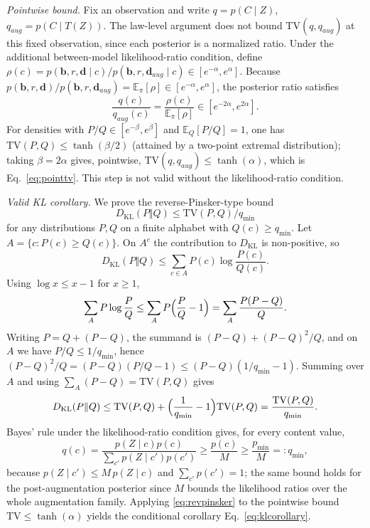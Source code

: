 \documentclass[electronics,article,submit,moreauthors]{Definitions/mdpi}
\begin{document}
\emph{Pointwise bound.} Fix an observation and write $q=p(C\mid Z)$, $q_{aug}=p(C\mid T(Z))$. The law-level argument does not bound $\mathrm{TV}(q,q_{aug})$ at this fixed observation, since each posterior is a normalized ratio. Under the additional between-model likelihood-ratio condition, define $\rho(c)=p(\mathbf b,r,\mathbf d\mid c)/p(\mathbf b,r,\mathbf d_{aug}\mid c)\in[e^{-\alpha},e^{\alpha}]$. Because $p(\mathbf b,r,\mathbf d)/p(\mathbf b,r,\mathbf d_{aug})=\mathbb E_\pi[\rho]\in[e^{-\alpha},e^{\alpha}]$, the posterior ratio satisfies
\begin{equation}
\frac{q(c)}{q_{aug}(c)}=\frac{\rho(c)}{\mathbb E_\pi[\rho]}\in[e^{-2\alpha},e^{2\alpha}].
\end{equation}
For densities with $P/Q\in[e^{-\beta},e^{\beta}]$ and $\mathbb E_Q[P/Q]=1$, one has $\mathrm{TV}(P,Q)\le\tanh(\beta/2)$ (attained by a two-point extremal distribution); taking $\beta=2\alpha$ gives, pointwise, $\mathrm{TV}(q,q_{aug})\le\tanh(\alpha)$, which is Eq.~\eqref{eq:pointtv}. This step is not valid without the likelihood-ratio condition.

\emph{Valid KL corollary.} We prove the reverse-Pinsker-type bound
\begin{equation*}
D_{\mathrm{KL}}(P\Vert Q)\le \mathrm{TV}(P,Q)/q_{\min}
\end{equation*}
for any distributions $P,Q$ on a finite alphabet with $Q(c)\ge q_{\min}$. Let $A=\{c:P(c)\ge Q(c)\}$. On $A^c$ the contribution to $D_{\mathrm{KL}}$ is non-positive, so
\begin{equation*}
D_{\mathrm{KL}}(P\Vert Q)\le\sum_{c\in A}P(c)\log\frac{P(c)}{Q(c)}.
\end{equation*}
Using $\log x\le x-1$ for $x\ge1$,
\begin{equation*}
\sum_{A}P\log\frac{P}{Q}\le\sum_{A}P\Bigl(\frac{P}{Q}-1\Bigr)=\sum_{A}\frac{P(P-Q)}{Q}.
\end{equation*}
Writing $P=Q+(P-Q)$, the summand is $(P-Q)+(P-Q)^2/Q$, and on $A$ we have $P/Q\le 1/q_{\min}$, hence $(P-Q)^2/Q=(P-Q)(P/Q-1)\le(P-Q)(1/q_{\min}-1)$. Summing over $A$ and using $\sum_A(P-Q)=\mathrm{TV}(P,Q)$ gives
\begin{equation}
D_{\mathrm{KL}}(P\Vert Q)\le\mathrm{TV}(P,Q)+\Bigl(\frac{1}{q_{\min}}-1\Bigr)\mathrm{TV}(P,Q)=\frac{\mathrm{TV}(P,Q)}{q_{\min}}.
\label{eq:revpinsker}
\end{equation}
Bayes' rule under the likelihood-ratio condition gives, for every content value,
\begin{equation}
q(c)=\frac{p(Z\mid c)p(c)}{\sum_{c'}p(Z\mid c')p(c')}\ge \frac{p(c)}{M}\ge \frac{p_{\min}}{M}=:q_{\min},
\end{equation}
because $p(Z\mid c')\le M\,p(Z\mid c)$ and $\sum_{c'}p(c')=1$; the same bound holds for the post-augmentation posterior since $M$ bounds the likelihood ratios over the whole augmentation family. Applying \eqref{eq:revpinsker} to the pointwise bound $\mathrm{TV}\le\tanh(\alpha)$ yields the conditional corollary Eq.~\eqref{eq:klcorollary}.
\end{document}
